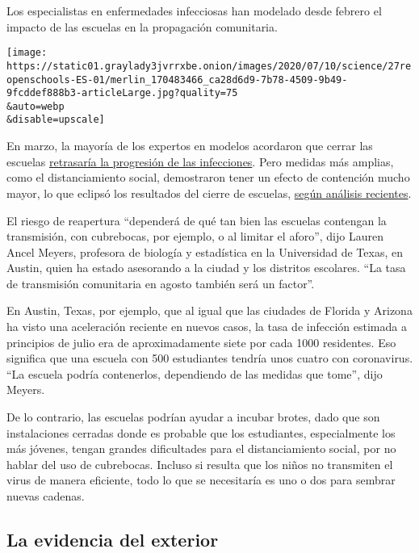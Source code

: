 Los especialistas en enfermedades infecciosas han modelado desde febrero
el impacto de las escuelas en la propagación comunitaria.

\texttt{[image: https://static01.graylady3jvrrxbe.onion/images/2020/07/10/science/27reopenschools-ES-01/merlin\_170483466\_ca28d6d9-7b78-4509-9b49-9fcddef888b3-articleLarge.jpg?quality=75\\\&auto=webp\\\&disable=upscale]}

En marzo, la mayoría de los expertos en modelos acordaron que cerrar las
escuelas
\href{https://www.nytimes3xbfgragh.onion/2020/05/05/health/coronavirus-children-transmission-school.html}{retrasaría
la progresión de las infecciones}. Pero medidas más amplias, como el
distanciamiento social, demostraron tener un efecto de contención mucho
mayor, lo que eclipsó los resultados del cierre de escuelas,
\href{https://www.medrxiv.org/content/10.1101/2020.04.16.20068403v1}{según
análisis recientes}.

El riesgo de reapertura ``dependerá de qué tan bien las escuelas
contengan la transmisión, con cubrebocas, por ejemplo, o al limitar el
aforo'', dijo Lauren Ancel Meyers, profesora de biología y estadística
en la Universidad de Texas, en Austin, quien ha estado asesorando a la
ciudad y los distritos escolares. ``La tasa de transmisión comunitaria
en agosto también será un factor''.

En Austin, Texas, por ejemplo, que al igual que las ciudades de Florida
y Arizona ha visto una aceleración reciente en nuevos casos, la tasa de
infección estimada a principios de julio era de aproximadamente siete
por cada 1000 residentes. Eso significa que una escuela con 500
estudiantes tendría unos cuatro con coronavirus. ``La escuela podría
contenerlos, dependiendo de las medidas que tome'', dijo Meyers.

De lo contrario, las escuelas podrían ayudar a incubar brotes, dado que
son instalaciones cerradas donde es probable que los estudiantes,
especialmente los más jóvenes, tengan grandes dificultades para el
distanciamiento social, por no hablar del uso de cubrebocas. Incluso si
resulta que los niños no transmiten el virus de manera eficiente, todo
lo que se necesitaría es uno o dos para sembrar nuevas cadenas.

\hypertarget{la-evidencia-del-exterior}{%
\subsection{La evidencia del exterior}\label{la-evidencia-del-exterior}}

